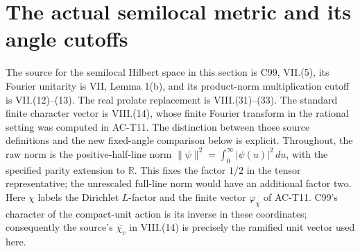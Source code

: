 \section{The actual semilocal metric and its angle cutoffs}

The source for the semilocal Hilbert space in this section is
C99, VII.(5), its Fourier unitarity is VII, Lemma 1(b), and
its product-norm multiplication cutoff is VII.(12)--(13).
The real prolate replacement is VIII.(31)--(33).
The standard finite character vector is VIII.(14), whose
finite Fourier transform in the rational setting was computed
in AC-T11.  The distinction between those source definitions
and the new fixed-angle comparison below is explicit.
Throughout, the raw norm is the positive-half-line norm
\(\|\psi\|^2=\int_0^\infty|\psi(u)|^2\,du\), with the
specified parity extension to \(\mathbb R\).
This fixes the factor \(1/2\) in the tensor representative;
the unrescaled full-line norm would have an additional
factor two.
Here \(\chi\) labels the Dirichlet \(L\)-factor and
the finite vector \(\varphi_\chi\) of AC-T11.
C99's character of the compact-unit action is its
inverse in these coordinates; consequently the
source's \(\overline{\chi_v}\) in VIII.(14) is
precisely the ramified unit vector used here.

